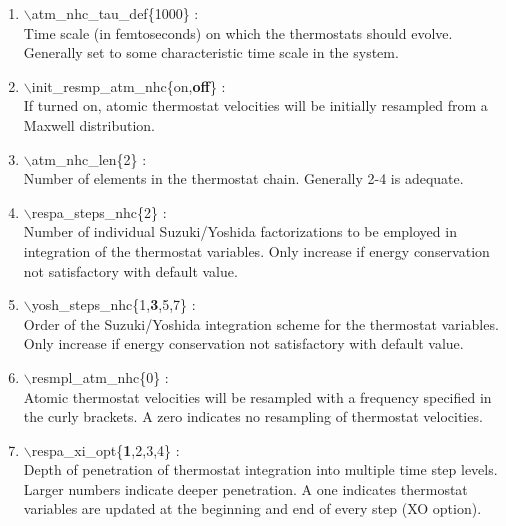 \documentclass[12pt]{article}
\begin{document}
\begin{enumerate}
 \vspace{0.15in} 
 \item   $\backslash$atm\_nhc\_tau\_def\{1000\} : \\
  Time scale (in femtoseconds) on which the thermostats should evolve. 
  Generally set to some characteristic time scale in the system.

 \vspace{0.15in} 
 \item   $\backslash$init\_resmp\_atm\_nhc\{on,{\bf off}\} : \\
   If turned on, atomic thermostat velocities will be initially resampled from
   a Maxwell distribution.

 \vspace{0.15in} 
 \item   $\backslash$atm\_nhc\_len\{2\} : \\
   Number of elements in the thermostat chain.  Generally 2-4 is adequate.

 \vspace{0.15in}
 \item   $\backslash$respa\_steps\_nhc\{2\} : \\
     Number of individual Suzuki/Yoshida factorizations to be employed in
     integration of the thermostat variables.  Only
     increase if energy conservation not satisfactory with default value.

 \vspace{0.15in}
 \item   $\backslash$yosh\_steps\_nhc\{1,{\bf 3},5,7\} : \\
   Order of the Suzuki/Yoshida integration scheme for the thermostat
   variables.  Only increase if energy conservation not satisfactory with
   default value.

 \vspace{0.15in} 
 \item   $\backslash$resmpl\_atm\_nhc\{0\} : \\
   Atomic thermostat velocities will be resampled with a frequency specified
   in the curly brackets.  A zero indicates no resampling of thermostat
   velocities.

 \vspace{0.15in}
 \item   $\backslash$respa\_xi\_opt\{{\bf 1},2,3,4\} : \\
   Depth of penetration of thermostat integration into multiple time step
   levels.  Larger numbers indicate deeper penetration.  A one indicates
   thermostat variables are updated at the beginning and end of 
   every step (XO option).


\end{enumerate}
\end{document}
